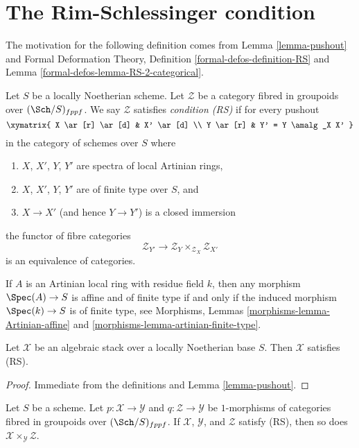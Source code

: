 \section{The Rim-Schlessinger condition}
\label{section-RS}

\noindent
The motivation for the following definition comes from
Lemma \ref{lemma-pushout}
and
Formal Deformation Theory, Definition \ref{formal-defos-definition-RS} and
Lemma \ref{formal-defos-lemma-RS-2-categorical}.

\begin{definition}
\label{definition-RS}
Let $S$ be a locally Noetherian scheme. Let $\mathcal{Z}$ be a category
fibred in groupoids over $(\Sch/S)_{fppf}$. We say $\mathcal{Z}$
satisfies {\it condition (RS)} if for every pushout
$$
\xymatrix{
X \ar[r] \ar[d] & X' \ar[d] \\
Y \ar[r] & Y' = Y \amalg_X X'
}
$$
in the category of schemes over $S$ where
\begin{enumerate}
\item $X$, $X'$, $Y$, $Y'$ are spectra of local Artinian rings,
\item $X$, $X'$, $Y$, $Y'$ are of finite type over $S$, and
\item $X \to X'$ (and hence $Y \to Y'$) is a closed immersion
\end{enumerate}
the functor of fibre categories
$$
\mathcal{Z}_{Y'}
\longrightarrow
\mathcal{Z}_Y \times_{\mathcal{Z}_X} \mathcal{Z}_{X'}
$$
is an equivalence of categories.
\end{definition}

\noindent
If $A$ is an Artinian local ring with residue field $k$, then
any morphism $\Spec(A) \to S$ is affine and of finite type if and
only if the induced morphism $\Spec(k) \to S$ is of finite type, see
Morphisms, Lemmas \ref{morphisms-lemma-Artinian-affine} and
\ref{morphisms-lemma-artinian-finite-type}.

\begin{lemma}
\label{lemma-algebraic-stack-RS}
Let $\mathcal{X}$ be an algebraic stack over a locally Noetherian base
$S$. Then $\mathcal{X}$ satisfies (RS).
\end{lemma}

\begin{proof}
Immediate from the definitions and Lemma \ref{lemma-pushout}.
\end{proof}

\begin{lemma}
\label{lemma-fibre-product-RS}
Let $S$ be a scheme. Let $p : \mathcal{X} \to \mathcal{Y}$ and
$q : \mathcal{Z} \to \mathcal{Y}$ be $1$-morphisms of categories
fibred in groupoids over $(\Sch/S)_{fppf}$. If $\mathcal{X}$, $\mathcal{Y}$,
and $\mathcal{Z}$ satisfy (RS), then so
does $\mathcal{X} \times_\mathcal{Y} \mathcal{Z}$.
\end{lemma}

